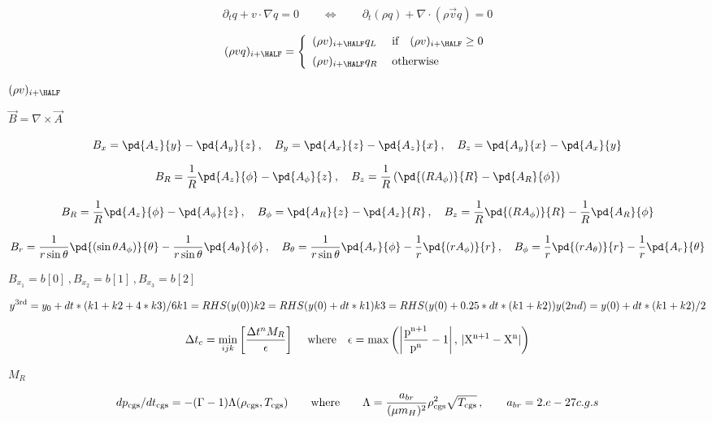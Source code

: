 \documentclass{article}
\begin{document}
\[ \partial_tq + v\cdot \nabla q = 0 
    \qquad\Longleftrightarrow\qquad
    \partial_t(\rho q) + \nabla\cdot(\rho\vec{v}q) = 0 
\]
\pagebreak

\[ 
  (\rho vq)_{i+\HALF} = \left\{\begin{array}{ll}
  (\rho v)_{i+\HALF}q_L & \;\textrm{if} 
         \quad (\rho v)_{i+\HALF} \ge 0 \\ \noalign{\medskip}
  (\rho v)_{i+\HALF}q_R & \; \textrm{otherwise}  
 \end{array}\right.
\]
\pagebreak

$ (\rho v)_{i+\HALF}$
\pagebreak

$ \vec{B} = \nabla\times\vec{A} $
\pagebreak

\[
  B_x = \pd{A_z}{y} - \pd{A_y}{z} \,,\quad
  B_y = \pd{A_x}{z} - \pd{A_z}{x} \,,\quad
  B_z = \pd{A_y}{x} - \pd{A_x}{y}
  \]
\pagebreak

\[
   B_R = \frac{1}{R}\pd{A_z}{\phi}    - \pd{A_\phi}{z}      \,,\quad
   B_z = \frac{1}{R}\left(\pd{(RA_\phi)}{R} - \pd{A_R}{\phi}\right)
  \]
\pagebreak

\[
  B_R    = \frac{1}{R}\pd{A_z}{\phi} - \pd{A_\phi}{z}  \,,\quad
  B_\phi = \pd{A_R}{z} - \pd{A_z}{R}             \,,\quad
  B_z    = \frac{1}{R}\pd{(RA_\phi)}{R} - \frac{1}{R}\pd{A_R}{\phi}
  \]
\pagebreak

\[ 
  B_r      =   \frac{1}{r\sin\theta}\pd{(\sin\theta A_\phi)}{\theta} 
             - \frac{1}{r\sin\theta}\pd{A_\theta}{\phi}           \,,\quad
  B_\theta =   \frac{1}{r\sin\theta}\pd{A_r}{\phi} 
             - \frac{1}{r}\pd{(rA_\phi)}{r}                         \,,\quad
  B_\phi   =   \frac{1}{r}\pd{(rA_\theta)}{r}                  
             - \frac{1}{r}\pd{A_r}{\theta}
  \]
\pagebreak

$ B_{x_1} = b[0]\,, B_{x_2} = b[1]\,, B_{x_3} = b[2] $
\pagebreak

\[
  y^{\rm 3rd} = y_0 + dt*(k1 + k2 + 4*k3)/6

  k1 = RHS(y(0))
  k2 = RHS(y(0) + dt*k1)
  k3 = RHS(y(0) + 0.25*dt*(k1 + k2))

  y(2nd) = y(0) + dt*(k1 + k2)/2
\]
\pagebreak

\[
   \Delta t_c = \min_{ijk}\left[\frac{\Delta t^n M_R}{\epsilon}\right]
   \,\quad\rm{where}\quad
   \epsilon = \max\left(\left|\frac{p^{n+1}}{p^n} - 1\right|,\,
              |X^{n+1}-X^n|\right)
\]
\pagebreak

$ M_R $
\pagebreak

\[
     dp_{\rm cgs}/dt_{\rm cgs}
    = -(\Gamma - 1) \Lambda(\rho_{\rm cgs}, T_{\rm cgs})
     \qquad{\rm where}\qquad
     \Lambda = \frac{a_{br}}{(\mu m_H)^2} \rho_{\rm cgs}^2 \sqrt{T_{\rm cgs}}
    \,,\qquad
       a_{br} = 2.e-27   c.g.s
\]
\pagebreak
\end{document}
